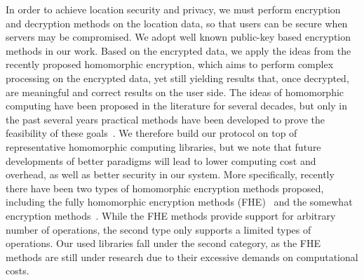 In order to achieve location security and privacy,  we must perform encryption and decryption methods on the location data, so that users can be secure when servers may be compromised. We adopt well known public-key based encryption methods in our work. Based on the encrypted data, we apply the ideas from the recently proposed homomorphic encryption, which aims to perform complex processing on the encrypted data, yet still yielding results that, once decrypted, are meaningful and correct results on the user side. The ideas of homomorphic computing have been proposed in the literature for several decades, but only in the past several years practical methods have been developed to prove the feasibility of these goals~\cite{Gentry:2009:FHE:1536414.1536440, van2010fully, brakerski2011fully, brakerski2014efficient, brakerski2012leveled, fan2012somewhat, lopez2012fly, brakerski2012fully, bos2013improved, gentry2013homomorphic, brakerski2014lattice}. We therefore build our protocol on top of representative homomorphic computing libraries,  but we note that future developments of better paradigms will lead to lower computing cost and overhead, as well as better security in our system. More specifically, recently there have been two types of homomorphic encryption methods proposed, including the fully homomorphic encryption methods (FHE)~\cite{Gentry:2009:FHE:1536414.1536440, van2010fully, brakerski2011fully} and the somewhat encryption methods~\cite{brakerski2014efficient, brakerski2012leveled, fan2012somewhat, lopez2012fly, brakerski2012fully, bos2013improved, gentry2013homomorphic, brakerski2014lattice}.  While the FHE methods provide support for arbitrary number of operations, the second type only supports a  limited types of operations. Our used libraries fall under the second category, as the FHE methods are still under research due to their excessive demands on computational costs. 
